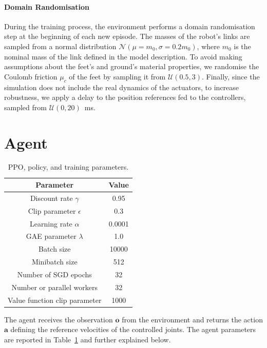 \paragraph{Domain Randomisation}

During the training process, the environment performs a domain randomisation step at the beginning of each new episode.
The masses of the robot's links are sampled from a normal distribution $\mathcal{N}(\mu=m_0, \sigma=0.2 m_0)$, where $m_0$ is the nominal mass of the link defined in the model description.
To avoid making assumptions about the feet's and ground's material properties, we randomise the Coulomb friction $\mu_c$ of the feet by sampling it from $\mathcal{U}(0.5, 3)$.
Finally, since the simulation does not include the real dynamics of the actuators, to increase robustness, we apply a delay to the position references fed to the \pid controllers, sampled from $\mathcal{U}(0, 20)$~ms.

\section{Agent}

\begin{table}
    \small
    \center
    \caption{PPO, policy, and training parameters.}
    \label{tab:training_parameters}
    \newcommand{\ck}{\checkmark}
    \begin{tabular}{cc}
        \toprule
        Parameter & \multicolumn{1}{c}{Value} \\
        \midrule \rowcolor{black!10}
        Discount rate $\gamma$ & 0.95 \\
        Clip parameter $\epsilon$ & 0.3 \\ \rowcolor{black!10}
        Learning rate $\alpha$ & 0.0001 \\ 
        GAE parameter $\lambda$ & 1.0 \\ \rowcolor{black!10}
        Batch size & 10000 \\ 
        Minibatch size & 512 \\ \rowcolor{black!10}
        Number of SGD epochs & 32 \\ 
        Number or parallel workers & 32 \\ \rowcolor{black!10}
        Value function clip parameter & 1000 \\ 
        \bottomrule
    \end{tabular}
\end{table}

The agent receives the observation $\boldsymbol{o}$ from the environment and returns the action $\mathbf{a}$ defining the reference velocities of the controlled joints.
The agent parameters are reported in Table~\ref{tab:training_parameters} and further explained below.

